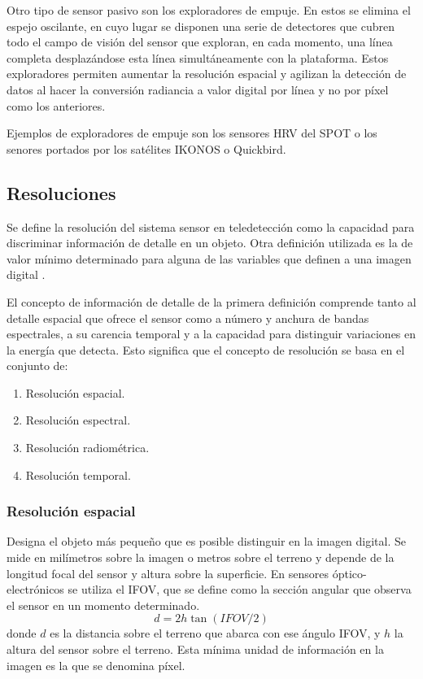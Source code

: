 Otro tipo de sensor pasivo son los exploradores de empuje. En estos se elimina el espejo oscilante, en cuyo lugar se disponen una serie de detectores que cubren todo el campo de visión del sensor que exploran, en cada momento, una línea completa desplazándose esta línea simultáneamente con la plataforma. Estos exploradores permiten aumentar la resolución espacial y agilizan la detección de datos al hacer la conversión radiancia a valor digital por línea y no por píxel como los anteriores.\Sep

Ejemplos de exploradores de empuje son los sensores \ac{HRV} del SPOT o los senores portados por los satélites IKONOS o Quickbird.

\subsection{Resoluciones}
Se define la resolución del sistema sensor en teledetección como la capacidad para discriminar información de detalle en un objeto. Otra definición utilizada es la de valor mínimo determinado para alguna de las variables que definen a una imagen digital \citep{chuvieco2002teledeteccion} .\Sep

El concepto de información de detalle de la primera definición comprende tanto al detalle espacial que ofrece el sensor como a número y anchura de bandas espectrales, a su carencia temporal y a la capacidad para distinguir variaciones en la energía que detecta. Esto significa que el concepto de resolución se basa en el conjunto de:
\begin{enumerate}
	\item Resolución espacial.
	\item Resolución espectral.
	\item Resolución radiométrica.
	\item Resolución temporal.
\end{enumerate}

\subsubsection{Resolución espacial}
Designa el objeto más pequeño que es posible distinguir en la imagen digital. Se mide en milímetros sobre la imagen o metros sobre el terreno y depende de la longitud focal del sensor y altura sobre la superficie. En sensores óptico-electrónicos se utiliza el \ac{IFOV}, que se define como la sección angular que observa el sensor en un momento determinado.
\begin{equation}
	d=2h\tan(IFOV/2)
	\label{eq:res_esp}
\end{equation}
donde $d$ es la distancia sobre el terreno que abarca con ese ángulo \ac{IFOV}, y $h$ la altura del sensor sobre el terreno. Esta mínima unidad de información en la imagen es la que se denomina píxel.\Sep

